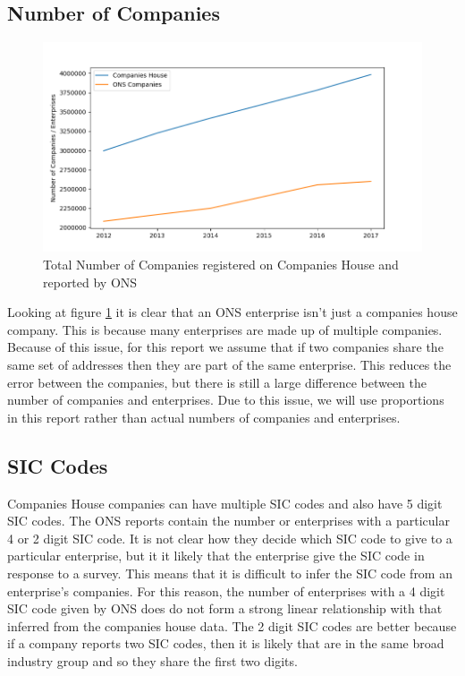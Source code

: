 \documentclass[a4paper,10pt]{article}
\begin{document}
   \subsection{Number of Companies}
   \label{company_enterprise_error}

   \begin{figure}[h]
      \begin{center}
         \caption{Total Number of Companies registered on Companies House and reported by ONS}
         \label{ch_vs_ons}
         \includegraphics[width=12cm]{graphs/companies_house_vs_ons/companies_house_vs_ons}
      \end{center}
   \end{figure}

   Looking at figure \ref{ch_vs_ons} it is clear that an ONS enterprise isn't just a companies house company. This is because many enterprises are made up of multiple companies. Because of this issue, for this report we assume that if two companies share the same set of addresses then they are part of the same enterprise. This reduces the error between the companies, but there is still a large difference between the number of companies and enterprises. Due to this issue, we will use proportions in this report rather than actual numbers of companies and enterprises.

   \subsection{SIC Codes}

   Companies House companies can have multiple SIC codes and also have 5 digit SIC codes. The ONS reports contain the number or enterprises with a particular 4 or 2 digit SIC code. It is not clear how they decide which SIC code to give to a particular enterprise, but it it likely that the enterprise give the SIC code in response to a survey. This means that it is difficult to infer the SIC code from an enterprise's companies. For this reason, the number of enterprises with a 4 digit SIC code given by ONS does do not form a strong linear relationship with that inferred from the companies house data. The 2 digit SIC codes are better because if a company reports two SIC codes, then it is likely that are in the same broad industry group and so they share the first two digits.
\end{document}
